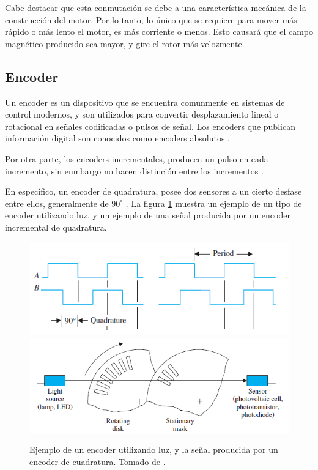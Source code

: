 Cabe destacar que esta conmutación se debe a una característica mecánica de la construcción del motor. Por lo tanto, lo único que se requiere para mover más rápido o más lento el motor, es más corriente o menos. Esto causará que el campo magnético producido sea mayor, y gire el rotor más velozmente.

\subsection{Encoder}
Un encoder es un dispositivo que se encuentra comunmente en sistemas de control modernos, y son utilizados para convertir desplazamiento lineal o rotacional en señales codificadas o pulsos de señal. Los encoders que publican información digital son conocidos como encoders absolutos \cite{Golnaraghi2017}.

Por otra parte, los encoders incrementales, producen un pulso en cada incremento, sin enmbargo no hacen distinción entre los incrementos \cite{Golnaraghi2017}.

En específico, un encoder de quadratura, posee dos sensores a un cierto desfase entre ellos, generalmente de $90^\circ$ . La figura \ref{F:encoder} muestra un ejemplo de un tipo de encoder utilizando luz, y un ejemplo de una señal producida por un encoder incremental de quadratura.

\begin{figure}[H]
\centering
\includegraphics[scale=0.5]{imagenes/encoder_quadratura.png}
\includegraphics[scale=0.5]{imagenes/encoder_opto.png}
\caption{Ejemplo de un encoder utilizando luz, y la señal producida por un encoder de cuadratura. Tomado de \cite{Golnaraghi2017}.}
\label{F:encoder}
\end{figure}

